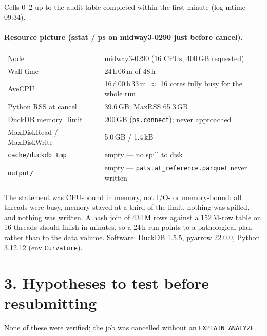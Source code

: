 \documentclass[11pt]{article}
\begin{document}
Cells 0--2 up to the audit table completed within the first minute (log mtime 09:34).

\paragraph{Resource picture (sstat / ps on midway3-0290 just before cancel).}
\begin{center}
\small
\begin{tabular}{ll}
\toprule
Node & midway3-0290 (16 CPUs, 400\,GB requested) \\
Wall time & 24\,h\,06\,m of 48\,h \\
AveCPU & 16\,d\,00\,h\,33\,m $\approx$ 16 cores fully busy for the whole run \\
Python RSS at cancel & 39.6\,GB; MaxRSS 65.3\,GB \\
DuckDB memory\_limit & 200\,GB (\texttt{ps.connect}); never approached \\
MaxDiskRead / MaxDiskWrite & 5.0\,GB / 1.4\,kB \\
\texttt{cache/duckdb\_tmp} & empty --- no spill to disk \\
\texttt{output/} & empty --- \texttt{patstat\_reference.parquet} never written \\
\bottomrule
\end{tabular}
\end{center}

The statement was CPU-bound in memory, not I/O- or memory-bound: all threads were busy,
memory stayed at a third of the limit, nothing was spilled, and nothing was written.
A hash join of 434\,M rows against a 152\,M-row table on 16 threads should finish in minutes,
so a 24\,h run points to a pathological plan rather than to the data volume.
Software: DuckDB 1.5.5, pyarrow 22.0.0, Python 3.12.12 (env \texttt{Curvature}).

\section*{3. Hypotheses to test before resubmitting}

None of these were verified; the job was cancelled without an \texttt{EXPLAIN ANALYZE}.
\end{document}
